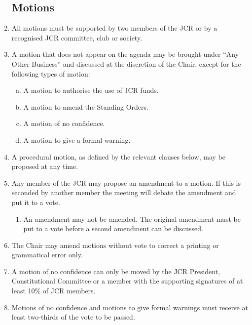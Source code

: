 \documentclass[12pt]{article}  %
\begin{document}
\begin{enumerate}
    \subsection{Motions}
    \item All motions must be supported by two members of the JCR or by a recognised JCR committee, club or society.
    \item A motion that does not appear on the agenda may be brought under “Any Other Business” and discussed at the discretion of the Chair, except for the following types of motion:
    \begin{enumerate}[(a)]
        \item A motion to authorise the use of JCR funds.
        \item A motion to amend the Standing Orders.
        \item A motion of no confidence.
        \item A motion to give a formal warning.
    \end{enumerate}
    \item A procedural motion, as defined by the relevant clauses below, may be proposed at any time.
    \item Any member of the JCR may propose an amendment to a motion. If this is seconded by another member the meeting will debate the amendment and put it to a vote.
    \begin{enumerate}
        \item An amendment may not be amended. The original amendment must be put to a vote before a second amendment can be discussed.
    \end{enumerate}
    \item The Chair may amend motions without vote to correct a printing or grammatical error only.
    \item A motion of no confidence can only be moved by the JCR President, Constitutional Committee or a member with the supporting signatures of at least 10\% of JCR members.
    \item Motions of no confidence and motions to give formal warnings must receive at least two-thirds of the vote to be passed.

\end{enumerate}
\end{document}
